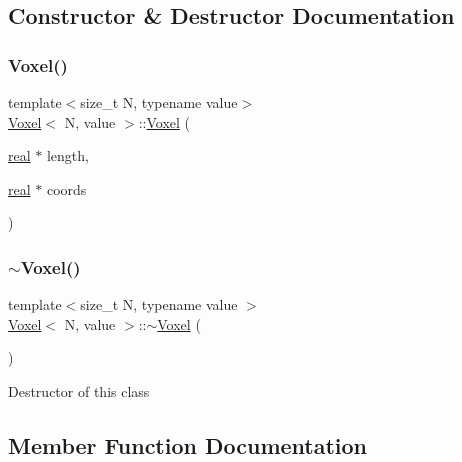 \subsection{Constructor \& Destructor Documentation}
\mbox{\label{classVoxel_a2de5f4a796b6232664726a75cc727873}} 
\subsubsection{\texorpdfstring{Voxel()}{Voxel()}}
{\footnotesize\ttfamily template$<$size\+\_\+t N, typename value$>$ \\
\mbox{\hyperlink{classVoxel}{Voxel}}$<$ N, value $>$\+::\mbox{\hyperlink{classVoxel}{Voxel}} (\begin{DoxyParamCaption}\item[{\mbox{\hyperlink{definitions_8h_aedc0ad84d1e764530814f57ad931d02a}{real}} $\ast$}]{length,  }\item[{\mbox{\hyperlink{definitions_8h_aedc0ad84d1e764530814f57ad931d02a}{real}} $\ast$}]{coords }\end{DoxyParamCaption})\hspace{0.3cm}{\ttfamily [inline]}}

\mbox{\label{classVoxel_a4e96d3d825885a1728f478bba74cd3c9}} 
\subsubsection{\texorpdfstring{$\sim$\+Voxel()}{~Voxel()}}
{\footnotesize\ttfamily template$<$size\+\_\+t N, typename value $>$ \\
\mbox{\hyperlink{classVoxel}{Voxel}}$<$ N, value $>$\+::$\sim$\mbox{\hyperlink{classVoxel}{Voxel}} (\begin{DoxyParamCaption}{ }\end{DoxyParamCaption})}

Destructor of this class 

\subsection{Member Function Documentation}
\mbox{\label{classVoxel_a3f219470ab58fc5da5431566fd093378}} 

